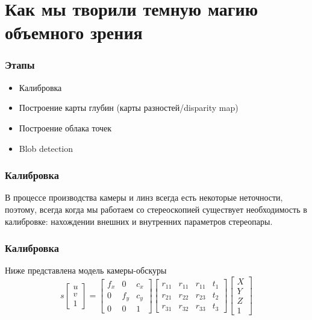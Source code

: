 \documentclass{beamer}
\begin{document}
	\section{Как мы творили темную магию объемного зрения}
		\begin{frame}
			\frametitle{Этапы}
			
			\begin{itemize}
				\item Калибровка
				\item Построение карты глубин (карты разностей/disparity map)
				\item Построение облака точек
				\item Blob detection
			\end{itemize}
		\end{frame}
		
		\begin{frame}
			\frametitle{Калибровка}
			В процессе производства камеры и линз всегда есть некоторые неточности, поэтому, всегда когда мы работаем со стереоскопией существует необходимость в калибровке: нахождении внешних и внутренних параметров стереопары.
		\end{frame}

		\begin{frame}
			\frametitle{Калибровка}
			Ниже представлена модель камеры-обскуры
			\begin{equation}
			s
			\begin{bmatrix}
			u\\v\\1
			\end{bmatrix}
			=
			\begin{bmatrix}
			f_{x}&0&c_{x}\\
			0&f_{y}&c_{y}\\
			0&0&1
			\end{bmatrix}
			\begin{bmatrix}
			r_{11}&r_{11}&r_{11}&t_{1}\\
			r_{21}&r_{22}&r_{23}&t_{2}\\
			r_{31}&r_{32}&r_{33}&t_{3}
			\end{bmatrix}
			\begin{bmatrix}
			X\\Y\\Z\\1
			\end{bmatrix}
			\end{equation}
		\end{frame}
		
\end{document}
